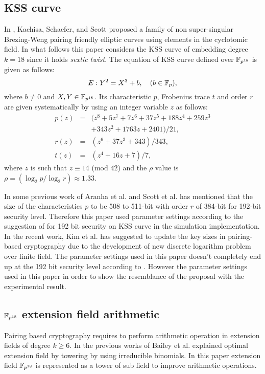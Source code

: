 \subsection{KSS curve}
In  \cite{kss}, Kachisa, Schaefer, and Scott proposed a family of non super-singular Brezing-Weng pairing friendly elliptic curves using elements in the cyclotomic field. In what follows this paper considers the KSS curve of  embedding degree $k=18$ since it holds \textit{sextic twist}. 
The equation of KSS curve defined over $\mathbb{F}_{p^{18}}$ is given as follows:
\begin{equation}\label{eq:KSS_curve}
E:Y^2=X^3+b, \quad \mbox{($b \in {\mathbb{F}}_{p}$)},
\end{equation}
where $b \neq 0$ and $X,Y \in \mathbb{F}_{p^{18}}$. Its characteristic $p$, Frobenius trace $t$ and order $r$ are given systematically by using an integer variable $z$ as follows:
\begin{subequations}
\begin{eqnarray}
p(z) &= & (z^8 +5z^7 +7z^6 +37z^5 +188z^4 +259z^3  \nonumber \\ 								
& & + 343z^2 +1763z+2401)/21,\\\label{eq:kss_char}
r(z) &= &(z^6 + 37z^3 + 343)/343,\label{eq:kss_degree}  \\
t(z) &=& (z^4 + 16z + 7)/7, \label{eq:kss_trace} 
\end{eqnarray}
\end{subequations} 
where $z$ is such that $z \equiv 14$ (mod $42$) and the $\rho$ value is $\rho = (\log_2 p/\log_2 r) \approx 1.33$.

In some previous work of  Aranha et al. \cite{aranha} and Scott et al. \cite{kss_param} has mentioned that the size of the characteristics $p$ to be 508 to 511-bit with order $r$ of 384-bit  for 192-bit security level.  
Therefore this paper used parameter settings according to the suggestion of \cite{aranha} for 192 bit security on KSS curve in the simulation implementation. In the recent work, Kim et al. \cite{kim_ecdlp} has suggested to update the key sizes in pairing-based cryptography due to the  development of new discrete logarithm problem over finite field. The parameter settings used in this paper doesn't completely end up at the 192 bit security level according to \cite{kim_ecdlp}. However the parameter settings used in this paper in order to show the resemblance of the proposal with the experimental result.

\subsection{$\mathbb{F}_{p^{18}}$ extension field arithmetic}
Pairing based cryptography requires to perform arithmetic operation in extension fields of degree $k \geq 6$\cite{Silverman}. In the previous works of Bailey et al. \cite{OEF} explained optimal extension field by towering by using irreducible binomials.  In this paper extension field  $\mathbb{F}_{p^{18}}$ is represented as a tower of sub field to improve arithmetic operations. 

